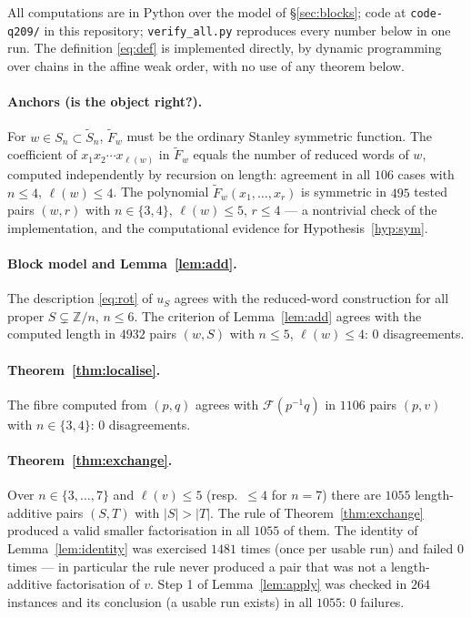 \documentclass[11pt]{article}
\theoremstyle{definition}
\newcommand{\Z}{\mathbb{Z}}
\newcommand{\Saff}{\widetilde{S}_{n}}
\newcommand{\Fw}{\widetilde{F}_{w}}
\begin{document}
All computations are in Python over the model of \S\ref{sec:blocks}; code at
\texttt{code-q209/} in this repository; \texttt{verify\_all.py} reproduces every number
below in one run. The definition \eqref{eq:def} is implemented directly,
by dynamic programming over chains in the affine weak order, with no use of any theorem below.

\paragraph{Anchors (is the object right?).}
For $w\in S_n\subset\Saff$, $\Fw$ must be the ordinary Stanley symmetric function. The
coefficient of $x_1x_2\cdots x_{\ell(w)}$ in $\Fw$ equals the number of reduced words of $w$,
computed independently by recursion on length: agreement in all $106$ cases with $n\le4$,
$\ell(w)\le4$. The polynomial $\Fw(x_1,\dots,x_r)$ is symmetric in $495$ tested pairs $(w,r)$
with $n\in\{3,4\}$, $\ell(w)\le5$, $r\le4$ --- a nontrivial check of the implementation, and the
computational evidence for Hypothesis~\ref{hyp:sym}.

\paragraph{Block model and Lemma~\ref{lem:add}.}
The description \eqref{eq:rot} of $u_S$ agrees with the reduced-word construction for all proper
$S\subsetneq\Z/n$, $n\le6$. The criterion of Lemma~\ref{lem:add} agrees with the computed length
in $4932$ pairs $(w,S)$ with $n\le5$, $\ell(w)\le4$: $0$ disagreements.

\paragraph{Theorem~\ref{thm:localise}.}
The fibre computed from $(p,q)$ agrees with $\mathcal F(p^{-1}q)$ in $1106$ pairs
$(p,v)$ with $n\in\{3,4\}$: $0$ disagreements.

\paragraph{Theorem~\ref{thm:exchange}.}
Over $n\in\{3,\dots,7\}$ and $\ell(v)\le5$ (resp.\ $\le4$ for $n=7$) there are $1055$
length-additive pairs $(S,T)$ with $|S|>|T|$. The rule of Theorem~\ref{thm:exchange} produced a
valid smaller factorisation in all $1055$ of them. The identity of Lemma~\ref{lem:identity} was
exercised $1481$ times (once per usable run) and failed $0$ times --- in particular the rule
never produced a pair that was not a length-additive factorisation of $v$. Step 1 of
Lemma~\ref{lem:apply} was checked in $264$ instances and its conclusion (a usable run exists)
in all $1055$: $0$ failures.
\end{document}
